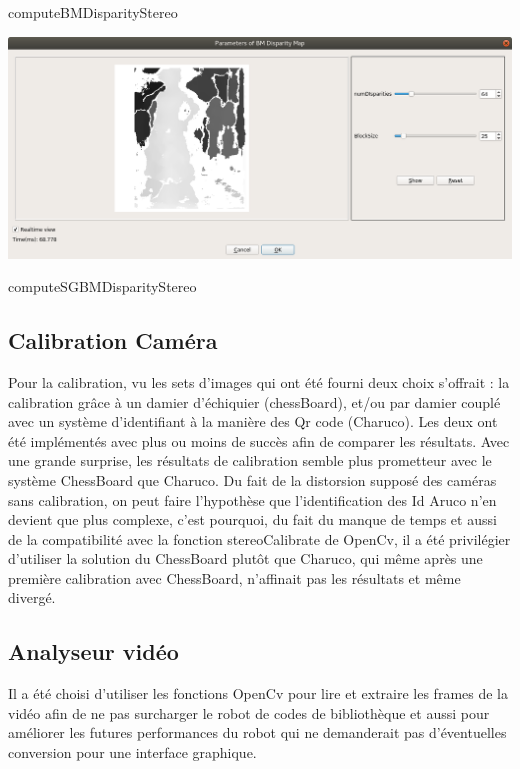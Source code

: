 \documentclass{article}
\begin{document}
computeBMDisparityStereo
    
\includegraphics[width=\linewidth]{img/sgbm.png}
    
computeSGBMDisparityStereo

\newpage
\subsection{Calibration Caméra}


Pour la calibration, vu les sets d'images qui ont été fourni deux choix s'offrait : la calibration grâce à un damier d'échiquier (chessBoard), et/ou par damier couplé avec un système d'identifiant à la manière des Qr code (Charuco). 
Les deux ont été implémentés avec plus ou moins de succès afin de comparer les résultats.
Avec une grande surprise, les résultats de calibration semble plus prometteur avec le système ChessBoard que Charuco.
Du fait de la distorsion supposé des caméras sans calibration, on peut faire l’hypothèse que l'identification des Id Aruco n'en devient que plus complexe, c'est pourquoi, du fait du manque de temps et aussi de la compatibilité avec la fonction stereoCalibrate de OpenCv, il a été privilégier d'utiliser la solution du ChessBoard plutôt que Charuco, qui même après une première calibration avec ChessBoard, n'affinait pas les résultats et même divergé.

\newpage
\subsection{Analyseur vidéo}

Il a été choisi d'utiliser les fonctions OpenCv pour lire et extraire les frames de la vidéo afin de ne pas surcharger le robot de codes de bibliothèque et aussi pour améliorer les futures performances du robot qui ne demanderait pas d'éventuelles conversion pour une interface graphique.\\
\end{document}
